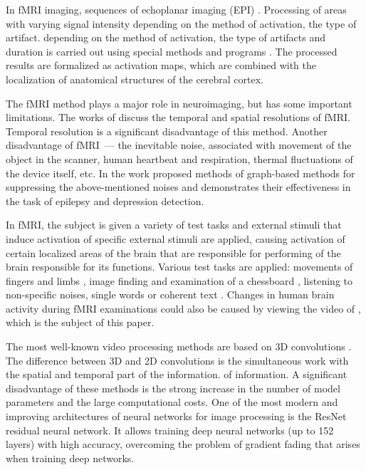 \documentclass{article}
\begin{document}
In fMRI imaging, sequences of
echoplanar imaging (EPI) \citep{Connelly1993, Kwong1992, Ogawa1992}.
Processing of areas with varying signal intensity depending on the method of activation, the type of artifact.
depending on the method of activation, the type of artifacts and duration
is carried out using special methods and programs 
\citep{Bandettini1992, BAUDENDISTEL1995701, COX1996162}.
The processed results are formalized as activation maps,
which are combined with the localization of anatomical structures
of the cerebral cortex.

The fMRI method plays a major role in neuroimaging, but has some important limitations.
The works of \citep{menon1999spatial, logothetis2008we} discuss the
temporal and spatial resolutions of fMRI. Temporal resolution is a significant
disadvantage of this method. Another disadvantage of fMRI~--- the inevitable noise,
associated with movement of the object in the scanner, human heartbeat and respiration, thermal
fluctuations of the device itself, etc. In the work \citep{1804.10167} proposed methods of
graph-based methods for suppressing the above-mentioned noises and demonstrates their effectiveness in the task of
epilepsy and depression detection.

In fMRI, the subject is given a variety of test tasks and external stimuli that induce activation of specific
external stimuli are applied, causing activation of certain
localized areas of the brain that are responsible for performing
of the brain responsible for its functions.
Various test tasks are applied: movements of fingers and limbs 
\citep{Roux1998, Papke1999}, image finding and examination
of a chessboard \citep{Engel1994, Schneider1994},
listening to non-specific noises, single words or coherent text \citep{Binder1994, Dymarkowski1998}.
Changes in human brain activity during fMRI examinations
could also be caused by viewing the video of \citep{decety1997brain},
which is the subject of this paper.

The most well-known video processing methods are based on 3D convolutions \citep{tran2015learning}.
The difference between 3D and 2D convolutions is the simultaneous work with the spatial and temporal part of the information.
of information. A significant disadvantage of these methods is the strong increase in the number of model parameters and the
large computational costs. One of the most modern and improving architectures of
neural networks for image processing is the ResNet~\citep{he2015deep} residual neural network.
It allows training deep neural networks (up to 152 layers) with high accuracy,
overcoming the problem of gradient fading that arises when training deep networks.
\end{document}
